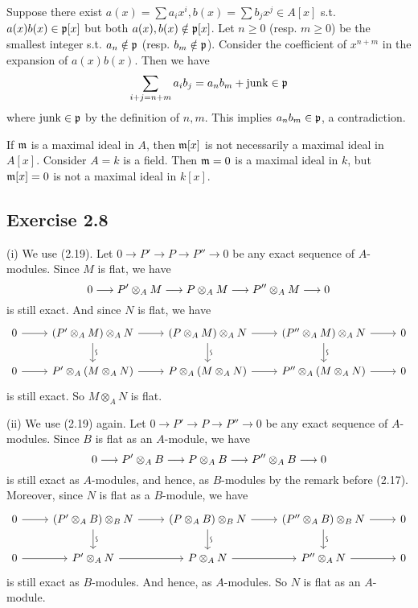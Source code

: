 \documentclass[../A&M.tex]{subfiles}
\begin{document}
Suppose there exist $a(x) = \sum a_ix^i, b(x) = \sum b_jx^j \in A[x]$ s.t. $a(x)b(x) \in \mathfrak{p}[x]$ but both $a(x),b(x) \notin \mathfrak{p}[x]$. Let $n\geq0$ (resp. $m\geq0$) be the smallest integer s.t. $a_n \notin \mathfrak{p}$ (resp. $b_m \notin \mathfrak{p}$). Consider the coefficient of $x^{n+m}$ in the expansion of $a(x)b(x)$. Then we have
$$
\sum_{i+j = n+m} a_ib_j = a_nb_m + \operatorname{junk} \in \mathfrak{p}
$$
where $\operatorname{junk} \in \mathfrak{p}$ by the definition of $n,m$. This implies $a_nb_m \in \mathfrak{p}$, a contradiction.

If $\mathfrak{m}$ is a maximal ideal in $A$, then $\mathfrak{m}[x]$ is not necessarily a maximal ideal in $A[x]$. Consider $A=k$ is a field. Then $\mathfrak{m} = 0$ is a maximal ideal in $k$, but $\mathfrak{m}[x] = 0$ is not a maximal ideal in $k[x]$.

\subsection*{Exercise 2.8}

(i) We use (2.19). Let $0 \to P' \to P \to P'' \to 0$ be any exact sequence of $A$-modules. Since $M$ is flat, we have
$$
0 \longrightarrow P' \otimes_A M \longrightarrow P \otimes_A M \longrightarrow P'' \otimes_A M \longrightarrow 0
$$
is still exact. And since $N$ is flat, we have
$$
\begin{tikzcd}
0 \arrow{r} & (P' \otimes_A M) \otimes_A N \arrow{r} \visoarrow{d} &  (P \otimes_A M) \otimes_A N \arrow{r} \visoarrow{d} &  (P'' \otimes_A M) \otimes_A N \arrow{r} \visoarrow{d} & 0 \\ 
0 \arrow{r} & P' \otimes_A (M \otimes_A N) \arrow{r} & P \otimes_A (M \otimes_A N) \arrow{r} & P'' \otimes_A (M \otimes_A N) \arrow[r] & 0
\end{tikzcd}
$$
is still exact. So $M \otimes_A N$ is flat.

(ii) We use (2.19) again. Let $0 \to P' \to P \to P'' \to 0$ be any exact sequence of $A$-modules. Since $B$ is flat as an $A$-module, we have
$$
0 \longrightarrow P' \otimes_A B \longrightarrow P \otimes_A B \longrightarrow P'' \otimes_A B \longrightarrow 0
$$
is still exact as $A$-modules, and hence, as $B$-modules by the remark before (2.17). Moreover, since $N$ is flat as a $B$-module, we have
$$
\begin{tikzcd}
0 \arrow{r} & (P' \otimes_A B) \otimes_B N \arrow{r} \visoarrow{d} &  (P \otimes_A B) \otimes_B N \arrow{r} \visoarrow{d} &  (P'' \otimes_A B) \otimes_B N \arrow{r} \visoarrow{d} & 0 \\ 
0 \arrow{r} & P' \otimes_A N \arrow{r} & P \otimes_A N \arrow{r} & P'' \otimes_A N \arrow[r] & 0
\end{tikzcd}
$$
is still exact as $B$-modules. And hence, as $A$-modules. So $N$ is flat as an $A$-module.
\end{document}
